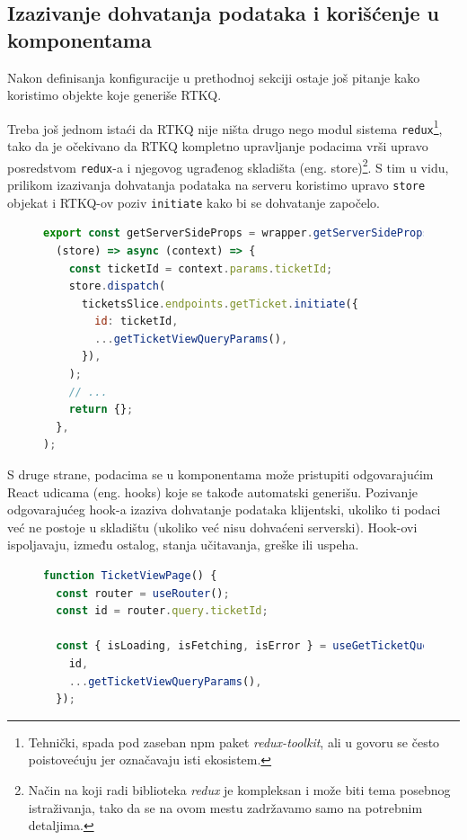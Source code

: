 \documentclass[12pt,oneside]{memoir}
\begin{document}
\subsection{Izazivanje dohvatanja podataka i korišćenje u komponentama}

Nakon definisanja konfiguracije u prethodnoj sekciji ostaje još pitanje kako koristimo objekte koje generiše RTKQ.

Treba još jednom istaći da RTKQ nije ništa drugo nego modul sistema \verb|redux|\footnote{Tehnički, spada pod zaseban npm paket \textit{redux-toolkit}, ali u govoru se često poistovećuju jer označavaju isti ekosistem.}, tako da je očekivano da RTKQ kompletno upravljanje podacima vrši upravo posredstvom \verb|redux|-a i njegovog ugrađenog skladišta (eng. store)\footnote{Način na koji radi biblioteka \textit{redux} je kompleksan i može biti tema posebnog istraživanja, tako da se na ovom mestu zadržavamo samo na potrebnim detaljima.}. S tim u vidu, prilikom izazivanja dohvatanja podataka na serveru koristimo upravo \verb|store| objekat i RTKQ-ov poziv \verb|initiate| kako bi se dohvatanje započelo.

\begin{figure}[h]
\begin{lstlisting}[language=JavaScript, style=ES6, caption={Dohvatanje podataka o tiketu na serveru.}]
export const getServerSideProps = wrapper.getServerSideProps(
  (store) => async (context) => {
    const ticketId = context.params.ticketId;
    store.dispatch(
      ticketsSlice.endpoints.getTicket.initiate({
        id: ticketId,
        ...getTicketViewQueryParams(),
      }),
    );
    // ...
    return {};
  },
);
\end{lstlisting}
\end{figure}

S druge strane, podacima se u komponentama može pristupiti odgovarajućim React udicama (eng. hooks) \cite{reactdocshooks}  koje se takođe automatski generišu. Pozivanje odgovarajućeg hook-a izaziva dohvatanje podataka klijentski, ukoliko ti podaci već ne postoje u skladištu (ukoliko već nisu dohvaćeni serverski). Hook-ovi ispoljavaju, između ostalog, stanja učitavanja, greške ili uspeha.

\begin{figure}[h]
\begin{lstlisting}[language=JavaScript, style=ES6, caption={Korišćenje RTKQ hook-ova.}]
function TicketViewPage() {
  const router = useRouter();
  const id = router.query.ticketId;

  const { isLoading, isFetching, isError } = useGetTicketQuery({
    id,
    ...getTicketViewQueryParams(),
  });
\end{lstlisting}
\end{figure}
\end{document}

